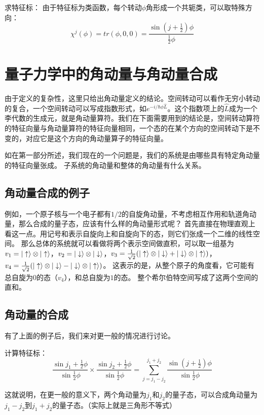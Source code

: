 求特征标：
由于特征标为类函数，每个转动$\phi$角形成一个共轭类，可以取特殊方向：
\begin{displaymath}
\chi^j(\phi) = tr(\phi, 0, 0) = \frac{\sin( j+\frac 1 2 )\phi }{\frac 1 2 \phi} 
\end{displaymath}

\section{量子力学中的角动量与角动量合成}

由于定义的复杂性，这里只给出角动量定义的结论。空间转动可以看作无穷小转动的复合，一个空间转动可以写成指数形式，如$e^{-i/\hbar \phi \hat{L}}$。这个指数项上的$\hat L$成为一个李代数的生成元，就是角动量算符。我们在下面需要用到的结论是，空间转动算符的特征向量与角动量算符的特征向量相同，一个态的在某个方向的空间转动下是不变的，对应它是这个方向的角动量算子的特征向量。

如在第一部分所述，我们现在的一个问题是，我们的系统是由哪些具有特定角动量的特征向量张成。
子系统的角动量和整体的角动量有什么关系。

\subsection{角动量合成的例子}
例如，一个原子核与一个电子都有$1/2$的自旋角动量，不考虑相互作用和轨道角动量，那么合成的量子态，应该有什么样的角动量形式呢？
首先直接在物理直观上看这一点。用记号\vpp 和\vmm 表示自旋向上和自旋向下的态，则它们张成一个二维的线性空间。
那么总体的系统就可以看做将两个表示空间做直积，可以取一组基为$v_1 = \vert\uparrow\rangle\otimes\vert\uparrow\rangle$，$v_2 = \vert\downarrow\rangle\otimes\vert\downarrow\rangle$，$v_3 = \frac{1}{\sqrt{2}} (\vert\uparrow\rangle\otimes\vert\downarrow\rangle + \vert\downarrow\rangle \otimes \vert\uparrow\rangle)$，$v_4 = \frac{1}{\sqrt{2}} (\vert\uparrow\rangle\otimes\vert\downarrow\rangle - \vert\downarrow\rangle \otimes \vert\uparrow\rangle)$。
这表示的是，从整个原子的角度看，它可能有总自旋为$0$的态（$v_4$），和总自旋为$1$的态。
整个希尔伯特空间写成了这两个空间的直和。

\subsection{角动量的合成}
有了上面的例子后，我们来对更一般的情况进行讨论。

计算特征标：
\[
\frac{\sin j_1 + \frac 1 2 \phi}{\sin \frac 1 2 \phi} \times
\frac{\sin j_2 + \frac 1 2 \phi}{\sin \frac 1 2 \phi}
=
\sum_{j=j_1-j_2}^{j_1+j_2} \frac{\sin (j+\frac 1 2)\phi }{\sin \frac 1 2 \phi} 
\]

这就说明，在更一般的意义下，两个角动量为$j_1$和$j_2$的量子态，可以合成角动量为$j_1 - j_2$到$j_1+j_2$的量子态。（实际上就是三角形不等式）

